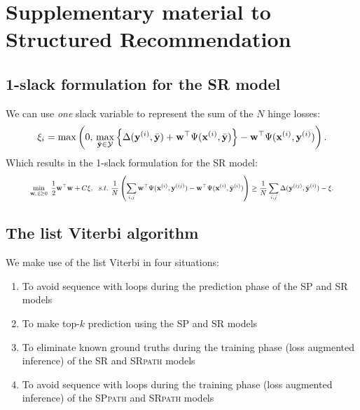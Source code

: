\appendix
\section{Supplementary material to Structured Recommendation}
\label{sec:supplement}

\subsection{1-slack formulation for the SR model}
\label{ssec:1slack_sr}

We can use \emph{one} slack variable to represent the sum of the $N$ hinge losses:
\begin{equation*}
\xi_i = \max \left( 0, \, 
        \max_{\bar{\mathbf{y}} \in \mathcal{Y}}
        \left\{ \Delta(\mathbf{y}^{(i)}, \bar{\mathbf{y}}) + \mathbf{w}^\top \Psi(\mathbf{x}^{(i)}, \bar{\mathbf{y}}) \right\} - \mathbf{w}^\top \Psi(\mathbf{x}^{(i)}, \mathbf{y}^{(i)}) \right).
\end{equation*}
Which results in the 1-slack formulation for the SR model:
\begin{equation*}
\resizebox{0.9\linewidth}{!}{$
\begin{aligned}
\min_{\w, \, \xi \ge 0} ~\frac{1}{2} \w^\top \w + C \xi, ~~s.t.~ \frac{1}{N} \left( \sum_{i,j} \w^\top \Psi(\x^{(i)}, \y^{(ij)}) - \w^\top \Psi(\x^{(i)}, \bar{\y}^{(i)}) \right) 
  \ge \frac{1}{N} \sum_{i,j} \Delta(\y^{(ij)}, \bar{\y}^{(i)}) - \xi.
\end{aligned}
$}
\end{equation*}


\subsection{The list Viterbi algorithm}
\label{sec:listviterbi-supp}

We make use of the list Viterbi in four situations:
\begin{enumerate}
  \item To avoid sequence with loops during the prediction phase of the SP and SR models
  \item To make top-$k$ prediction using the SP and SR models
  \item To eliminate known ground truths during the training phase (\ie loss augmented inference) of the SR and \textsc{SRpath} models
  \item To avoid sequence with loops during the training phase (\ie loss augmented inference) of the \textsc{SPpath} and \textsc{SRpath} models
\end{enumerate}

